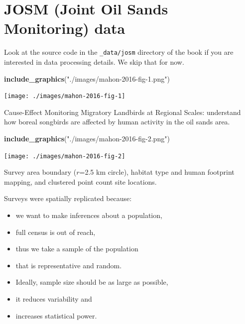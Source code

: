\documentclass[12pt,]{book}
\newenvironment{Shaded}{\begin{snugshade}}{\end{snugshade}}
\newcommand{\KeywordTok}[1]{\textcolor[rgb]{0.13,0.29,0.53}{\textbf{#1}}}
\newcommand{\NormalTok}[1]{#1}
\newcommand{\StringTok}[1]{\textcolor[rgb]{0.31,0.60,0.02}{#1}}
\providecommand{\tightlist}{%
  \setlength{\itemsep}{0pt}\setlength{\parskip}{0pt}}
\begin{document}
\hypertarget{josm-joint-oil-sands-monitoring-data}{%
\section{JOSM (Joint Oil Sands Monitoring) data}\label{josm-joint-oil-sands-monitoring-data}}

Look at the source code in the \texttt{\_data/josm} directory of the book
if you are interested in data processing details.
We skip that for now.

\begin{Shaded}
\begin{Highlighting}[]
\KeywordTok{include_graphics}\NormalTok{(}\StringTok{"./images/mahon-2016-fig-1.png"}\NormalTok{)}
\end{Highlighting}
\end{Shaded}

\texttt{[image: ./images/mahon-2016-fig-1]}

Cause-Effect Monitoring Migratory Landbirds at Regional Scales:
understand how boreal songbirds are affected by human activity in the oil sands area.

\begin{Shaded}
\begin{Highlighting}[]
\KeywordTok{include_graphics}\NormalTok{(}\StringTok{"./images/mahon-2016-fig-2.png"}\NormalTok{)}
\end{Highlighting}
\end{Shaded}

\texttt{[image: ./images/mahon-2016-fig-2]}

Survey area boundary (\(r\)=2.5 km circle), habitat type and human footprint mapping,
and clustered point count site locations.

Surveys were spatially replicated because:

\begin{itemize}
\tightlist
\item
  we want to make inferences about a population,
\item
  full census is out of reach,
\item
  thus we take a sample of the population
\item
  that is representative and random.
\item
  Ideally, sample size should be as large as possible,
\item
  it reduces variability and
\item
  increases statistical power.
\end{itemize}
\end{document}
